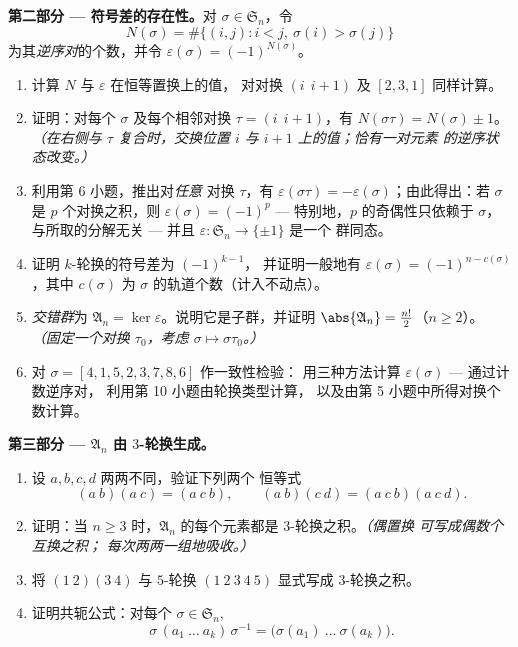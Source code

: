 \begin{problem}
\medskip
\noindent\textbf{第二部分 --- 符号差的存在性。}对 $\sigma
\in \mathfrak S_n$，令
\[
N(\sigma) = \#\bigl\{(i, j) : i < j,\ \sigma(i) >
\sigma(j)\bigr\}
\]
为其\emph{逆序对}的个数，并令 $\varepsilon(\sigma) =
(-1)^{N(\sigma)}$。
\begin{enumerate}[resume]
  \item 计算 $N$ 与 $\varepsilon$ 在恒等置换上的值，
        对对换 $(i\ \ i{+}1)$ 及 $[2, 3, 1]$ 同样计算。
  \item 证明：对每个 $\sigma$ 及每个相邻对换
        $\tau = (i\ \ i{+}1)$，有
        $N(\sigma\tau) = N(\sigma) \pm 1$。\emph{（在右侧与
        $\tau$ 复合时，交换位置 $i$ 与
        $i + 1$ 上的值；恰有一对元素
        的逆序状态改变。）}
  \item 利用第 6 小题，推出对\emph{任意}
        对换 $\tau$，有 $\varepsilon(\sigma\tau) =
        -\varepsilon(\sigma)$；由此得出：若 $\sigma$ 是
        $p$ 个对换之积，则 $\varepsilon(\sigma)
        = (-1)^p$ --- 特别地，$p$ 的奇偶性只依赖于
        $\sigma$，与所取的分解无关 --- 并且
        $\varepsilon \colon \mathfrak S_n \to \{\pm 1\}$ 是一个
        群同态。
  \item 证明 $k$-轮换的符号差为 $(-1)^{k-1}$，
        并证明一般地有 $\varepsilon(\sigma) = (-1)^{n -
        c(\sigma)}$，其中 $c(\sigma)$ 为
        $\sigma$ 的轨道个数（计入不动点）。
  \item \emph{交错群}为 $\mathfrak A_n =
        \ker\varepsilon$。说明它是子群，并证明
        $\abs{\mathfrak A_n} = \frac{n!}2$（$n \geq 2$）。
        \emph{（固定一个对换 $\tau_0$，考虑 $\sigma
        \mapsto \sigma\tau_0$。）}
  \item 对 $\sigma = [4, 1, 5, 2, 3, 7, 8, 6]$ 作一致性检验：
        用三种方法计算 $\varepsilon(\sigma)$ --- 通过计数逆序对，
        利用第 10 小题由轮换类型计算，
        以及由第 5 小题中所得对换个数计算。
\end{enumerate}

\medskip
\noindent\textbf{第三部分 --- $\mathfrak A_n$ 由
$3$-轮换生成。}
\begin{enumerate}[resume]
  \item 设 $a, b, c, d$ 两两不同，验证下列两个
        恒等式
        \[
        (a\ b)(a\ c) = (a\ c\ b),
        \qquad
        (a\ b)(c\ d) = (a\ c\ b)(a\ c\ d) .
        \]
  \item 证明：当 $n \geq 3$ 时，$\mathfrak
        A_n$ 的每个元素都是 $3$-轮换之积。\emph{（偶置换
        可写成偶数个互换之积；
        每次两两一组地吸收。）}
  \item 将 $(1\ 2)(3\ 4)$ 与 $5$-轮换 $(1\ 2\ 3\ 4\ 5)$
        显式写成 $3$-轮换之积。
  \item 证明共轭公式：对每个 $\sigma \in
        \mathfrak S_n$,
        \[
        \sigma\,(a_1\ \dots\ a_k)\,\sigma^{-1}
        = \bigl(\sigma(a_1)\ \dots\ \sigma(a_k)\bigr) .
        \]
\end{enumerate}


\end{problem}
